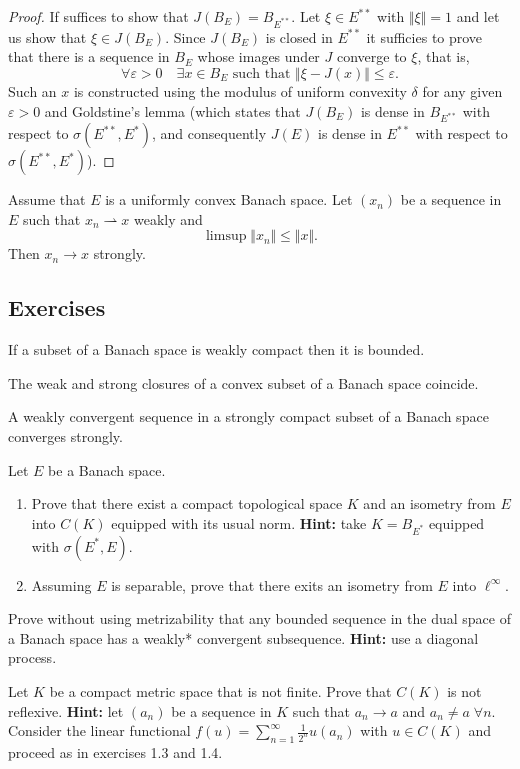 \documentclass{article}
\theoremstyle{definition}
\numberwithin{equation}{section}
\begin{document}
\begin{proof}
	If suffices to show that $J(B_E)=B_{E^{**}}$. Let $\xi\in E^{**}$ with $\Vert\xi\Vert=1$ and let us show that $\xi\in J(B_E)$. Since $J(B_E)$ is closed in $E^{**}$ it sufficies to prove that there is a sequence in $B_E$ whose images under $J$ converge to $\xi$, that is,
	\[\forall\varepsilon>0\quad\exists x\in B_E\text{ such that }\Vert\xi-J(x)\Vert\leq\varepsilon.\]
	Such an $x$ is constructed using the modulus of uniform convexity $\delta$ for any given $\varepsilon>0$ and Goldstine's lemma (which states that $J(B_E)$ is dense in $B_{E^{**}}$ with respect to $\sigma(E^{**},E^*)$, and consequently $J(E)$ is dense in $E^{**}$ with respect to $\sigma(E^{**},E^*)$).
\end{proof}
\begin{prop}
	Assume that $E$ is a uniformly convex Banach space. Let $(x_n)$ be a sequence in $E$ such that $x_n\rightharpoonup x$ weakly and 
	\[\limsup\Vert x_n\Vert\leq\Vert x\Vert.\]
	Then $x_n\to x$ strongly.
\end{prop}

	\subsection{Exercises}
	\begin{exer*}[3.1]
		If a subset of a Banach space is weakly compact then it is bounded.
	\end{exer*}
	\begin{exer*}[3.3]
		The weak and strong closures of a convex subset of a Banach space coincide.
	\end{exer*}
	\begin{exer*}[3.5]
		A weakly convergent sequence in a strongly compact subset of a Banach space converges strongly.
	\end{exer*}
	\begin{exer*}[3.20]
		Let $E$ be a Banach space.
		\begin{enumerate}
			\item Prove that there exist a compact topological space $K$ and an isometry from $E$ into $C(K)$ equipped with its usual norm. \textbf{Hint:} take $K=B_{E^*}$ equipped with $\sigma(E^*,E)$.
			\item Assuming $E$ is separable, prove that there exits an isometry from $E$ into $\ell^\infty$.
		\end{enumerate}
	\end{exer*}
	\begin{exer*}[3.21]
		Prove without using metrizability that any bounded sequence in the dual space of a Banach space has a weakly* convergent subsequence. \textbf{Hint:} use a diagonal process.
	\end{exer*}
	\begin{exer*}
		Let $K$ be a compact metric space that is not finite. Prove that $C(K)$ is not reflexive. \textbf{Hint:} let $(a_n)$ be a sequence in $K$ such that $a_n\to a$ and $a_n\neq a\;\forall n$. Consider the linear functional $f(u)=\sum_{n=1}^\infty\frac{1}{2^n}u(a_n)$ with $u\in C(K)$ and proceed as in exercises 1.3 and 1.4.
	\end{exer*}
\clearpage
\end{document}
